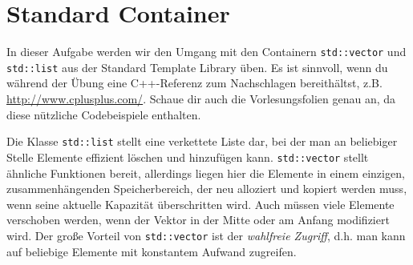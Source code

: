 \section{Standard Container} 
In dieser Aufgabe werden wir den Umgang mit den Containern \texttt{std::vector} und \texttt{std::list} aus der Standard Template Library üben.
Es ist sinnvoll, wenn du während der Übung eine C++-Referenz zum Nachschlagen bereithältst, z.B. \url{http://www.cplusplus.com/}.
Schaue dir auch die Vorlesungsfolien genau an, da diese nützliche Codebeispiele enthalten.

Die Klasse \texttt{std::list} stellt eine verkettete Liste dar, bei der man an beliebiger Stelle Elemente effizient löschen und hinzufügen kann. \texttt{std::vector} stellt ähnliche Funktionen bereit, allerdings liegen hier die Elemente in einem einzigen, zusammenhängenden Speicherbereich, der neu alloziert und kopiert werden muss, wenn seine aktuelle Kapazität überschritten wird.
Auch müssen viele Elemente verschoben werden, wenn der Vektor in der Mitte oder am Anfang modifiziert wird.
Der große Vorteil von \texttt{std::vector} ist der \emph{wahlfreie Zugriff}, d.h. man kann auf beliebige Elemente mit konstantem Aufwand zugreifen.


